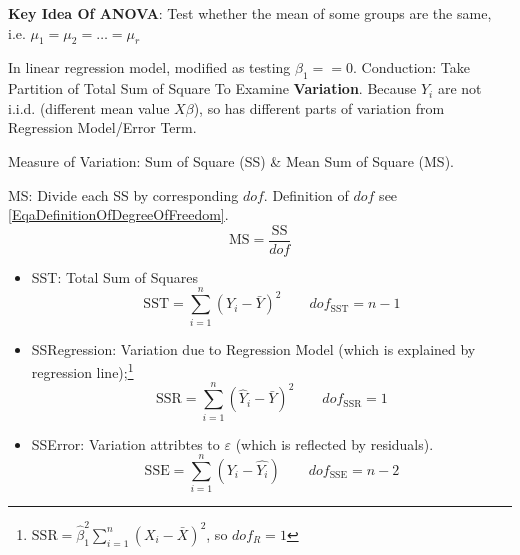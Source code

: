 \begin{point}
    \textbf{Key Idea Of ANOVA}: Test whether the mean of some groups are the same, i.e. $ \mu_1=\mu _2=\ldots=\mu _r $ 
\end{point}



    In linear regression model, modified as testing $ \beta _1==0 $. Conduction: Take Partition of Total Sum of Square To Examine \textbf{Variation}. Because $ Y_i $ are not i.i.d. (different mean value $ X\beta  $), so has different parts of variation from Regression Model/Error Term.




    Measure of Variation: Sum of Square (SS) \& Mean Sum of Square (MS).

    MS: Divide each SS by corresponding $ dof $. Definition of $ dof $ see \autoref{EqaDefinitionOfDegreeOfFreedom}.
    \begin{equation}
        \mathrm{MS}=\dfrac{\mathrm{SS}}{dof} 
    \end{equation}

\begin{itemize}[topsep=2pt,itemsep=2pt]
    \item SST: Total Sum of Squares
    \begin{equation}
        \mathrm{SST}=\sum_{i=1}^n(Y_i-\bar{Y})^2 \qquad dof_{\mathrm{SST}}=n-1
    \end{equation}
    \item SSRegression: Variation due to Regression Model  (which is explained by regression line);\footnote{$ \mathrm{SSR}=\hat{\beta }_1^2\sum_{i=1}^n(X_i-\bar{X})^2$, so $ dof_R=1 $}
    \begin{equation}
        \mathrm{SSR}= \sum_{i=1}^n(\hat{Y}_i-\bar{Y})^2 \qquad dof_{\mathrm{SSR}}=1
    \end{equation}
    
    \item SSError: Variation attribtes to $ \varepsilon  $  (which is reflected by residuals).
    \begin{equation}
        \mathrm{SSE}= \sum_{i=1}^n(Y_i-\hat{Y_i}) \qquad dof_{\mathrm{SSE}}=n-2
    \end{equation}
\end{itemize}

